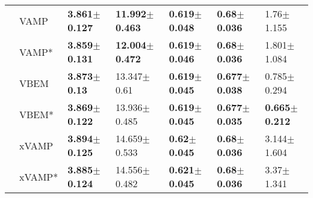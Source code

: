 \begin{tabular}{lllllll}
             & VAMP &  \textbf{3.861$\pm$0.127} &  \textbf{11.992$\pm$0.463} &  \textbf{0.619$\pm$0.048} &   \textbf{0.68$\pm$0.036} &            1.76$\pm$1.155 \\
             & VAMP* &  \textbf{3.859$\pm$0.131} &  \textbf{12.004$\pm$0.472} &  \textbf{0.619$\pm$0.046} &   \textbf{0.68$\pm$0.036} &           1.801$\pm$1.084 \\
             & VBEM &   \textbf{3.873$\pm$0.13} &            13.347$\pm$0.61 &  \textbf{0.619$\pm$0.045} &  \textbf{0.677$\pm$0.038} &           0.785$\pm$0.294 \\
             & VBEM* &  \textbf{3.869$\pm$0.122} &           13.936$\pm$0.485 &  \textbf{0.619$\pm$0.045} &  \textbf{0.677$\pm$0.035} &  \textbf{0.665$\pm$0.212} \\
             & xVAMP &  \textbf{3.894$\pm$0.125} &           14.659$\pm$0.533 &   \textbf{0.62$\pm$0.045} &   \textbf{0.68$\pm$0.036} &           3.144$\pm$1.604 \\
             & xVAMP* &  \textbf{3.885$\pm$0.124} &           14.556$\pm$0.482 &  \textbf{0.621$\pm$0.045} &   \textbf{0.68$\pm$0.036} &            3.37$\pm$1.341 \\
\bottomrule
\end{tabular}

